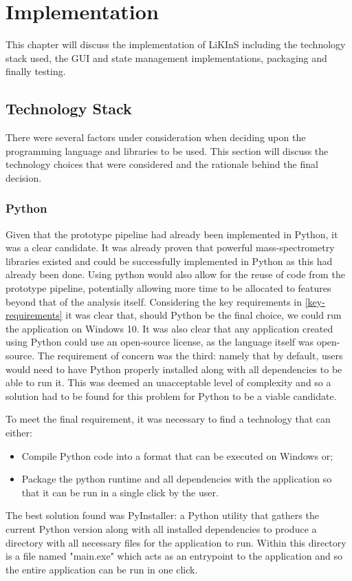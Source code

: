 \documentclass{l4proj}
\begin{document}
\chapter{Implementation}
This chapter will discuss the implementation of LiKInS including the technology stack used, the GUI and state management implementations, packaging and finally testing.

\section{Technology Stack} \label{technology-stack}
There were several factors under consideration when deciding upon the programming language and libraries to be used. This section will discuss the technology choices that were considered and the rationale behind the final decision.
\subsection{Python}
Given that the prototype pipeline had already been implemented in Python, it was a clear candidate. It was already proven that powerful mass-spectrometry libraries existed and could be successfully implemented in Python as this had already been done. Using python would also allow for the reuse of code from the prototype pipeline, potentially allowing more time to be allocated to features beyond that of the analysis itself. Considering the key requirements in \ref{key-requirements} it was clear that, should Python be the final choice, we could run the application on Windows 10. It was also clear that any application created using Python could use an open-source license, as the language itself was open-source. The requirement of concern was the third: namely that by default, users would need to have Python properly installed along with all dependencies to be able to run it. This was deemed an unacceptable level of complexity and so a solution had to be found for this problem for Python to be a viable candidate.

To meet the final requirement, it was necessary to find a technology that can either:
\begin{itemize}
    \item  Compile Python code into a format that can be executed on Windows or;
\item Package the python runtime and all dependencies with the application so that it can be run in a single click by the user.
\end{itemize}
The best solution found was PyInstaller: a Python utility that gathers the current Python version along with all installed dependencies to produce a directory with all necessary files for the application to run. Within this directory is a file named "main.exe" which acts as an entrypoint to the application and so the entire application can be run in one click.
\end{document}
